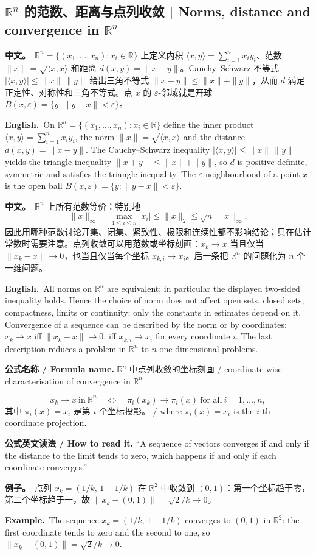 \documentclass[UTF8,11pt,a4paper]{ctexart}
\newcommand{\BOTH}[2]{\par\noindent\textbf{中文。}\ #1\par\noindent\textbf{English.}\ #2\par}
\newcommand{\EX}[2]{\par\noindent\textbf{例子。}\ #1\par\noindent\textbf{Example.}\ #2\par}
\newcommand{\READ}[1]{\par\noindent\textbf{公式英文读法 / How to read it.} #1\par}
\newcommand{\FORMULA}[2]{\par\noindent\textbf{公式名称 / Formula name.} #1 / #2\par}
\begin{document}
\subsection{\texorpdfstring{$\mathbb R^n$}{R^n} 的范数、距离与点列收敛 | Norms, distance and convergence in \texorpdfstring{$\mathbb R^n$}{R^n}}
\BOTH{$\mathbb R^n=\{(x_1,\dots,x_n):x_i\in\mathbb R\}$ 上定义内积 $\langle x,y\rangle=\sum_{i=1}^{n}x_iy_i$、范数 $\|x\|=\sqrt{\langle x,x\rangle}$ 和距离 $d(x,y)=\|x-y\|$。Cauchy--Schwarz 不等式 $|\langle x,y\rangle|\le\|x\|\,\|y\|$ 给出三角不等式 $\|x+y\|\le\|x\|+\|y\|$，从而 $d$ 满足正定性、对称性和三角不等式。点 $x$ 的 $\varepsilon$-邻域就是开球 $B(x,\varepsilon)=\{y:\|y-x\|<\varepsilon\}$。}{On $\mathbb R^n=\{(x_1,\dots,x_n):x_i\in\mathbb R\}$ define the inner product $\langle x,y\rangle=\sum_{i=1}^{n}x_iy_i$, the norm $\|x\|=\sqrt{\langle x,x\rangle}$ and the distance $d(x,y)=\|x-y\|$. The Cauchy--Schwarz inequality $|\langle x,y\rangle|\le\|x\|\,\|y\|$ yields the triangle inequality $\|x+y\|\le\|x\|+\|y\|$, so $d$ is positive definite, symmetric and satisfies the triangle inequality. The $\varepsilon$-neighbourhood of a point $x$ is the open ball $B(x,\varepsilon)=\{y:\|y-x\|<\varepsilon\}$.}
\BOTH{$\mathbb R^n$ 上所有范数等价：特别地
\[
\|x\|_\infty=\max_{1\le i\le n}|x_i|\le\|x\|_2\le\sqrt n\,\|x\|_\infty .
\]
因此用哪种范数讨论开集、闭集、紧致性、极限和连续性都不影响结论；只在估计常数时需要注意。点列收敛可以用范数或坐标刻画：$x_k\to x$ 当且仅当 $\|x_k-x\|\to0$，也当且仅当每个坐标 $x_{k,i}\to x_i$。后一条把 $\mathbb R^n$ 的问题化为 $n$ 个一维问题。}{All norms on $\mathbb R^n$ are equivalent; in particular the displayed two-sided inequality holds. Hence the choice of norm does not affect open sets, closed sets, compactness, limits or continuity; only the constants in estimates depend on it. Convergence of a sequence can be described by the norm or by coordinates: $x_k\to x$ iff $\|x_k-x\|\to0$, iff $x_{k,i}\to x_i$ for every coordinate $i$. The last description reduces a problem in $\mathbb R^n$ to $n$ one-dimensional problems.}
\FORMULA{$\mathbb R^n$ 中点列收敛的坐标刻画}{coordinate-wise characterisation of convergence in $\mathbb R^n$}
\[
x_k\to x\ \text{in}\ \mathbb R^n
\quad\Longleftrightarrow\quad
\pi_i(x_k)\to\pi_i(x)\ \text{for all}\ i=1,\dots,n,
\]
其中 $\pi_i(x)=x_i$ 是第 $i$ 个坐标投影。 / where $\pi_i(x)=x_i$ is the $i$-th coordinate projection.
\READ{“A sequence of vectors converges if and only if the distance to the limit tends to zero, which happens if and only if each coordinate converges.”}
\EX{点列 $x_k=(1/k,\,1-1/k)$ 在 $\mathbb R^2$ 中收敛到 $(0,1)$：第一个坐标趋于零，第二个坐标趋于一，故 $\|x_k-(0,1)\|=\sqrt2/k\to0$。}{The sequence $x_k=(1/k,\,1-1/k)$ converges to $(0,1)$ in $\mathbb R^2$: the first coordinate tends to zero and the second to one, so $\|x_k-(0,1)\|=\sqrt2/k\to0$.}
\end{document}
